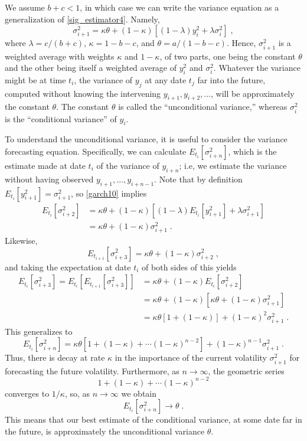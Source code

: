 We assume $b+c<1$, in which case we can write the variance equation as a generalization of \eqref{sig_estimator4}.  Namely,
\begin{equation}\label{garch10}
\sigma_{i+1}^2 = \kappa\theta + (1-\kappa)\left[  (1-\lambda) y_{i}^2 + \lambda\sigma^2_{i}\right]\;,
\end{equation}
where $\lambda=c/(b+c)$, 
$\kappa = 1-b-c$, and $\theta=a/(1-b-c)$.  Hence, $\sigma_{i+1}^2$ is a weighted average with weights $\kappa$ and $1-\kappa$, of two parts, one being the constant $\theta$ and the other being itself a weighted average of $y_{i}^2$ and $\sigma^2_{i}$.  Whatever the variance might be at time $t_i$, the variance of $y_j$ at any date $t_j$ far into the future, computed without knowing the intervening $y_{i+1}, y_{i+2},\ldots$, will be approximately the constant $\theta$.  The constant $\theta$ is called the ``unconditional variance,''  whereas $\sigma_{i}^2$ is the ``conditional variance'' of $y_i$.  

To understand the unconditional variance, it is useful to consider the variance forecasting equation.  Specifically, we can calculate $E_{t_i} \left[\sigma_{i+n}^2\right]$, which is the estimate made at date $t_i$ of the variance of $y_{i+n}$; i.e, we estimate the variance without having observed $y_{i+1},\ldots,y_{i+n-1}$.  Note that by definition $E_{t_{i}}[y_{i+1}^2]=\sigma_{i+1}^2$, so \eqref{garch10} implies
\begin{align*}
E_{t_{i}}\left[\sigma_{i+2}^2\right] &= \kappa\theta + (1-\kappa)\left[  (1-\lambda) E_{t_{i}}[y_{i+1}^2] + \lambda\sigma^2_{i+1}\right] \\
&= \kappa\theta + (1-\kappa)\sigma^2_{i+1}\; .
\end{align*}
Likewise,
$$E_{t_{i+1}}\left[\sigma_{i+3}^2\right] = \kappa\theta + (1-\kappa)\sigma^2_{i+2}\; ,$$
and taking the expectation at date $t_i$ of both sides of this yields
\begin{align*}
E_{t_{i}}\left[\sigma_{i+3}^2\right] = E_{t_{i}}\left[E_{t_{i+1}}\left[\sigma_{i+3}^2\right]\right] &=\kappa\theta + (1-\kappa)E_{t_{i}}\left[\sigma_{i+2}^2\right]\\
&=\kappa\theta + (1-\kappa)\left[\kappa\theta + (1-\kappa)\sigma^2_{i+1}\right]\\
&=\kappa\theta[1+(1-\kappa)] + (1-\kappa)^2\sigma^2_{i+1}\;.
\end{align*}
This generalizes to
$$E_{t_{i}}\left[\sigma_{i+n}^2\right] = \kappa\theta\left[1+(1-\kappa)+ \cdots (1-\kappa)^{n-2}\right] + (1-\kappa)^{n-1}\sigma^2_{i+1}\; .$$
Thus, there is decay at rate $\kappa$ in the importance of the current volatility $\sigma^2_{i+1}$ for forecasting the future volatility.  Furthermore, as $n\rightarrow \infty$, the geometric series
$$1+(1-\kappa)+ \cdots (1-\kappa)^{n-2}$$
converges to $1/\kappa$, so, as $n \rightarrow \infty$ we obtain
$$E_{t_{i}}\left[\sigma_{i+n}^2\right] \rightarrow \theta\; .$$
This means that our best estimate of the conditional variance, at some date far in the future, is approximately the unconditional variance $\theta$.

